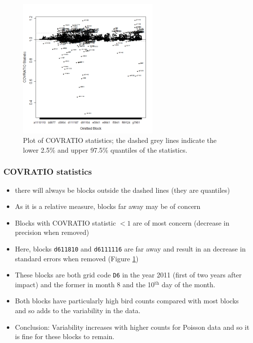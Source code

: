 \begin{frame}[fragile]
\begin{figure}[h]
  \centering
  \includegraphics[width=7cm]{bc/InfluenceMeasures_covratio.png}
  \caption{Plot of COVRATIO statistics; the dashed grey lines indicate the lower 2.5\% and upper 97.5\% quantiles of the statistics.}
  \label{fig:nsinfluence1}
\end{figure}
\end{frame}

\begin{frame}[fragile]
\frametitle{COVRATIO statistics}
\begin{itemize}
  \item there will always be blocks outside the dashed lines (they are quantiles)
  \item As it is a relative measure, blocks far away may be of concern
  \item Blocks with COVRATIO statistic $< 1$ are of most concern (decrease in precision when removed) 
  \item Here, blocks {\tt d611810} and {\tt d6111116} are far away and result in an decrease in standard errors when removed (Figure \ref{fig:nsinfluence1})
  \item These blocks are both grid code {\tt D6} in the year 2011 (first of two years after impact) and the former in month 8 and the 10$^{\textrm{th}}$ day of the month.  
  \item Both blocks have particularly high bird counts compared with most blocks and so adds to the variability in the data.
  \bigskip
  \item Conclusion: Variability increases with higher counts for Poisson data and so it is fine for these blocks to remain. 
  \end{itemize}
\end{frame}

